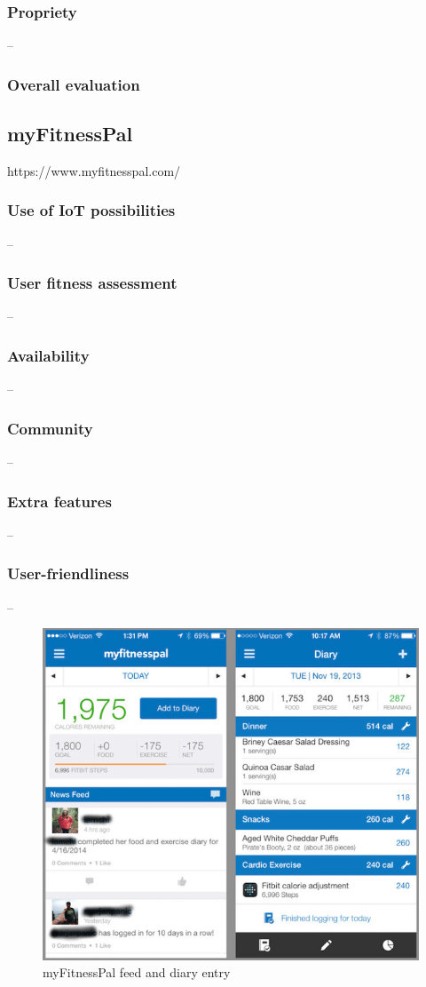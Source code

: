 \subsubsection*{Propriety} -- 
\subsubsection*{Overall evaluation}

\subsection{myFitnessPal}
https://www.myfitnesspal.com/
\subsubsection*{Use of IoT possibilities} --
\subsubsection*{User fitness assessment} --
\subsubsection*{Availability} --
\subsubsection*{Community} -- 
\subsubsection*{Extra features} -- 
\subsubsection*{User-friendliness} -- 

\begin{figure}[h]
    \includegraphics[width=\textwidth]{Images/myfitnesspal-researchgate.png}
    \caption{myFitnessPal feed and diary entry\cite{MFP-diary-img}}
\end{figure}

